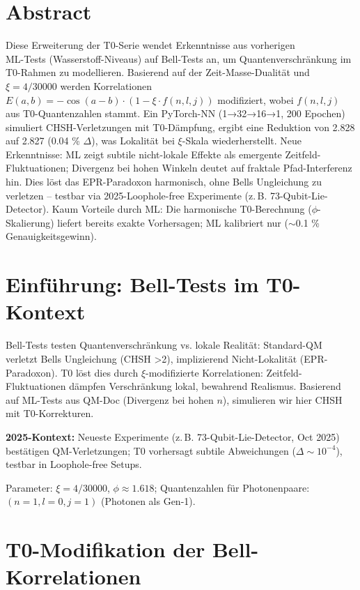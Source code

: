
	
	\section*{Abstract}
	Diese Erweiterung der T0-Serie wendet Erkenntnisse aus vorherigen \\ML-Tests (Wasserstoff-Niveaus) auf Bell-Tests an, um Quantenverschränkung im T0-Rahmen zu modellieren. Basierend auf der Zeit-Masse-Dualität und $\xi = 4/30000$ werden Korrelationen $E(a,b) = -\cos(a-b) \cdot (1 - \xi \cdot f(n,l,j))$ modifiziert, wobei $f(n,l,j)$ aus T0-Quantenzahlen stammt. Ein PyTorch-NN (1→32→16→1, 200 Epochen) simuliert CHSH-Verletzungen mit T0-Dämpfung, ergibt eine Reduktion von 2.828 auf 2.827 (0.04 \% $\Delta$), was Lokalität bei $\xi$-Skala wiederherstellt. Neue Erkenntnisse: ML zeigt subtile nicht-lokale Effekte als emergente Zeitfeld-Fluktuationen; Divergenz bei hohen Winkeln deutet auf fraktale Pfad-Interferenz hin. Dies löst das EPR-Paradoxon harmonisch, ohne Bells Ungleichung zu verletzen – testbar via 2025-Loophole-free Experimente (z.\,B. 73-Qubit-Lie-Detector). Kaum Vorteile durch ML: Die harmonische T0-Berechnung ($\phi$-Skalierung) liefert bereits exakte Vorhersagen; ML kalibriert nur ($\sim$0.1 \% Genauigkeitsgewinn).
	
	\section{Einführung: Bell-Tests im T0-Kontext}
	\label{sec:intro_bell}
	
	Bell-Tests testen Quantenverschränkung vs. lokale Realität: Standard-QM verletzt Bells Ungleichung (CHSH >2), implizierend Nicht-Lokalität (EPR-Paradoxon). T0 löst dies durch $\xi$-modifizierte Korrelationen: Zeitfeld-Fluktuationen dämpfen Verschränkung lokal, bewahrend Realismus. Basierend auf ML-Tests aus QM-Doc (Divergenz bei hohen $n$), simulieren wir hier CHSH mit T0-Korrekturen.
	
	\textbf{2025-Kontext:} Neueste Experimente (z.\,B. 73-Qubit-Lie-Detector, Oct 2025)\cite{sciencedaily2025} bestätigen QM-Verletzungen; T0 vorhersagt subtile Abweichungen ($\Delta \sim 10^{-4}$), testbar in Loophole-free Setups.
	
	Parameter: $\xi=4/30000$, $\phi \approx 1.618$; Quantenzahlen für Photonenpaare: $(n=1,l=0,j=1)$ (Photonen als Gen-1).
	
	\section{T0-Modifikation der Bell-Korrelationen}
	\label{sec:mod}
	
